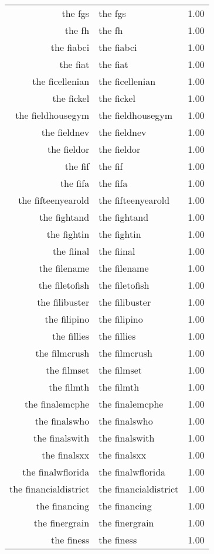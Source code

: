 \begin{table}[ht]
\begin{tabular}{rlr}
  the fgs & the fgs & 1.00 \\ 
  the fh & the fh & 1.00 \\ 
  the fiabci & the fiabci & 1.00 \\ 
  the fiat & the fiat & 1.00 \\ 
  the ficellenian & the ficellenian & 1.00 \\ 
  the fickel & the fickel & 1.00 \\ 
  the fieldhousegym & the fieldhousegym & 1.00 \\ 
  the fieldnev & the fieldnev & 1.00 \\ 
  the fieldor & the fieldor & 1.00 \\ 
  the fif & the fif & 1.00 \\ 
  the fifa & the fifa & 1.00 \\ 
  the fifteenyearold & the fifteenyearold & 1.00 \\ 
  the fightand & the fightand & 1.00 \\ 
  the fightin & the fightin & 1.00 \\ 
  the fiinal & the fiinal & 1.00 \\ 
  the filename & the filename & 1.00 \\ 
  the filetofish & the filetofish & 1.00 \\ 
  the filibuster & the filibuster & 1.00 \\ 
  the filipino & the filipino & 1.00 \\ 
  the fillies & the fillies & 1.00 \\ 
  the filmcrush & the filmcrush & 1.00 \\ 
  the filmset & the filmset & 1.00 \\ 
  the filmth & the filmth & 1.00 \\ 
  the finalemcphe & the finalemcphe & 1.00 \\ 
  the finalswho & the finalswho & 1.00 \\ 
  the finalswith & the finalswith & 1.00 \\ 
  the finalsxx & the finalsxx & 1.00 \\ 
  the finalwflorida & the finalwflorida & 1.00 \\ 
  the financialdistrict & the financialdistrict & 1.00 \\ 
  the financing & the financing & 1.00 \\ 
  the finergrain & the finergrain & 1.00 \\ 
  the finess & the finess & 1.00 \\ 

\end{tabular}
\end{table}
